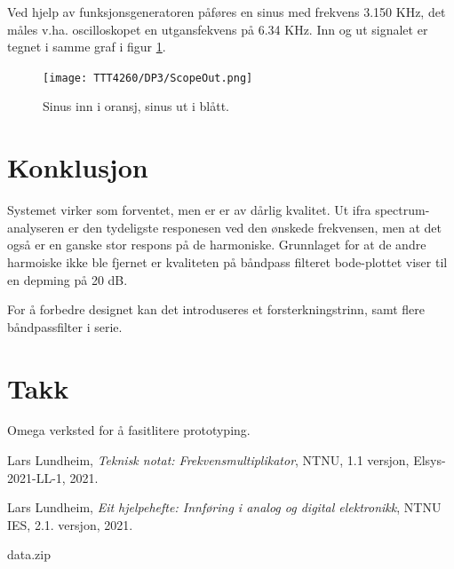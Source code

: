 \documentclass[a4paper,11pt,norsk]{article}
\begin{document}
Ved hjelp av funksjonsgeneratoren påføres en sinus med frekvens 3.150 KHz, det måles v.ha. oscilloskopet en utgansfekvens på 6.34 KHz. Inn og ut signalet er tegnet i samme graf i figur \ref{fig:Skop}.

\begin{figure}[H]
  \centering
  \texttt{[image: TTT4260/DP3/ScopeOut.png]} 
  \caption{Sinus inn i oransj, sinus ut i blått.}
  \label{fig:Skop}
\end{figure}


\section{Konklusjon}
\label{sec:konklusjon}

Systemet virker som forventet, men er er av dårlig kvalitet. Ut ifra spectrum-analyseren er den tydeligste responesen ved den ønskede frekvensen, men at det også er en ganske stor respons på de harmoniske. Grunnlaget for at de andre harmoiske ikke ble fjernet er kvaliteten på båndpass filteret bode-plottet viser til en depming på 20 dB.

For å forbedre designet kan det introduseres et forsterkningstrinn, samt flere båndpassfilter i serie.

\section{Takk}
Omega verksted for å fasitlitere prototyping.

\newpage
{}
{}
\begin{thebibliography}{99}

  Lars	Lundheim,
  \emph{Teknisk notat: Frekvensmultiplikator},
  NTNU,
  1.1 versjon,
  Elsys-2021-LL-1,
  2021.

  Lars	Lundheim,
  \emph{Eit hjelpehefte: Innføring i analog og digital elektronikk},
  NTNU IES,
  2.1. versjon,
  2021.

\end{thebibliography}

{}
\appendix
\label{sec:Vedlegg}
data.zip
\end{document}
